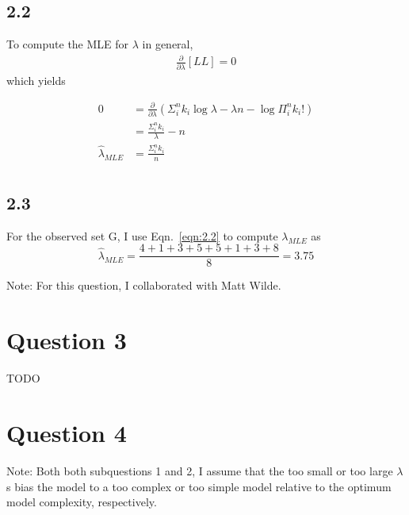 \documentclass[12pt]{amsart}
\begin{document}
\subsection*{2.2}

To compute the MLE for $\lambda$ in general,
\begin{equation} 
\begin{split}
\frac{\partial}{\partial \lambda} \left[ LL \right] = 0
\end{split}
\end{equation}
which yields

\begin{equation} \label{eqn:2.2}
\begin{split}
0 & = \frac{\partial}{\partial \lambda} \left( \Sigma_i^n k_i \log \lambda - \lambda n - \log \Pi_i^n k_i ! \right) \\ 
& = \frac{\Sigma_i^n k_i}{\lambda} - n \\
\hat{\lambda}_{MLE} & = \frac{\Sigma_i^n k_i}{n} \\
\end{split}
\end{equation}

\subsection*{2.3}
For the observed set G, I use Eqn.~\ref{eqn:2.2} to compute $\lambda_{MLE}$ as
\begin{equation}
\hat{\lambda}_{MLE} = \frac{4+1+3+5+5+1+3+8}{8} = 3.75
\end{equation}

Note: For this question, I collaborated with Matt Wilde.


\section*{Question 3}

TODO


\section*{Question 4}

Note: Both both subquestions 1 and 2, I assume that the too small or too large $\lambda$s bias the model to a too complex or too simple model relative to the optimum model complexity, respectively.
\end{document}
